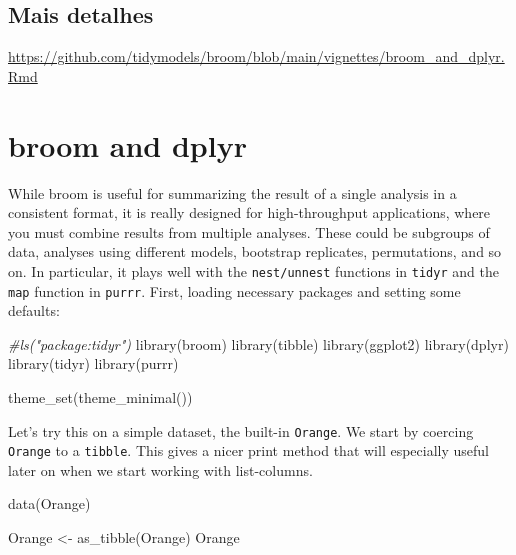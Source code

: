 \documentclass[
]{book}
\newenvironment{Shaded}{\begin{snugshade}}{\end{snugshade}}
\newcommand{\CommentTok}[1]{\textcolor[rgb]{0.56,0.35,0.01}{\textit{#1}}}
\newcommand{\FunctionTok}[1]{\textcolor[rgb]{0.00,0.00,0.00}{#1}}
\newcommand{\NormalTok}[1]{#1}
\newcommand{\OtherTok}[1]{\textcolor[rgb]{0.56,0.35,0.01}{#1}}
\begin{document}
\hypertarget{mais-detalhes}{%
\section{Mais detalhes}\label{mais-detalhes}}

\url{https://github.com/tidymodels/broom/blob/main/vignettes/broom_and_dplyr.Rmd}

\hypertarget{broom-and-dplyr}{%
\chapter{broom and dplyr}\label{broom-and-dplyr}}

While broom is useful for summarizing the result of a single analysis in a consistent format, it is really designed for high-throughput applications, where you must combine results from multiple analyses. These could be subgroups of data, analyses using different models, bootstrap replicates, permutations, and so on. In particular, it plays well with the \texttt{nest/unnest} functions in \texttt{tidyr} and the \texttt{map} function in \texttt{purrr}. First, loading necessary packages and setting some defaults:

\begin{Shaded}
\begin{Highlighting}[]
\CommentTok{\#ls("package:tidyr")}
\FunctionTok{library}\NormalTok{(broom)}
\FunctionTok{library}\NormalTok{(tibble)}
\FunctionTok{library}\NormalTok{(ggplot2)}
\FunctionTok{library}\NormalTok{(dplyr)}
\FunctionTok{library}\NormalTok{(tidyr)}
\FunctionTok{library}\NormalTok{(purrr)}

\FunctionTok{theme\_set}\NormalTok{(}\FunctionTok{theme\_minimal}\NormalTok{())}
\end{Highlighting}
\end{Shaded}

Let's try this on a simple dataset, the built-in \texttt{Orange}. We start by coercing \texttt{Orange} to a \texttt{tibble}. This gives a nicer print method that will especially useful later on when we start working with list-columns.

\begin{Shaded}
\begin{Highlighting}[]
\FunctionTok{data}\NormalTok{(Orange)}

\NormalTok{Orange }\OtherTok{\textless{}{-}} \FunctionTok{as\_tibble}\NormalTok{(Orange)}
\NormalTok{Orange}
\end{Highlighting}
\end{Shaded}
\end{document}

